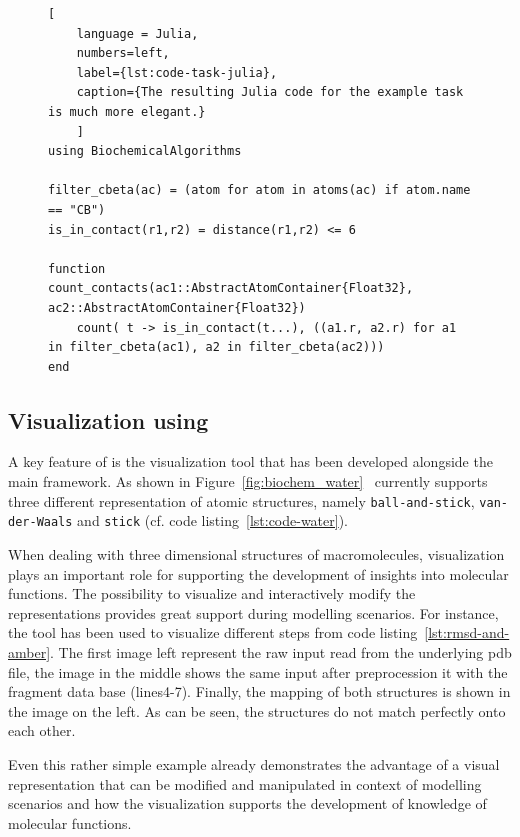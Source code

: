 \begin{figure}
\begin{lstlisting}[
	language = Julia, 
	numbers=left, 
	label={lst:code-task-julia}, 
	caption={The resulting Julia code for the example task is much more elegant.}
	]
using BiochemicalAlgorithms 

filter_cbeta(ac) = (atom for atom in atoms(ac) if atom.name == "CB")
is_in_contact(r1,r2) = distance(r1,r2) <= 6	

function count_contacts(ac1::AbstractAtomContainer{Float32}, ac2::AbstractAtomContainer{Float32})
	count( t -> is_in_contact(t...), ((a1.r, a2.r) for a1 in filter_cbeta(ac1), a2 in filter_cbeta(ac2)))
end
\end{lstlisting}
\end{figure}

\subsection{Visualization using \bioviz}

A key feature of \biochem is the visualization tool \textit{\bioviz} that
has been developed alongside the main framework. As shown in Figure~\ref{fig:biochem_water} \ \bioviz currently supports three different representation of atomic structures, namely \texttt{ball-and-stick}, \texttt{van-der-Waals} and \texttt{stick} (cf. code listing~\ref{lst:code-water}).

When dealing with three dimensional structures of macromolecules, visualization plays an important role for supporting the development of insights into molecular functions. The possibility to visualize and interactively modify the representations provides great support during modelling scenarios. For instance, the tool has been used to visualize different steps from code listing~\ref{lst:rmsd-and-amber}. The first image left represent the raw input read from the underlying pdb file, the image in the middle shows the same input after preprocession it with the fragment data base (lines4-7). Finally, the mapping of both structures is shown in the image on the left. As can be seen, the structures do not match perfectly onto each other. 

Even this rather simple example already demonstrates the advantage of a visual representation that can be modified and manipulated in context of modelling scenarios and how the visualization supports the development of knowledge of molecular functions.

